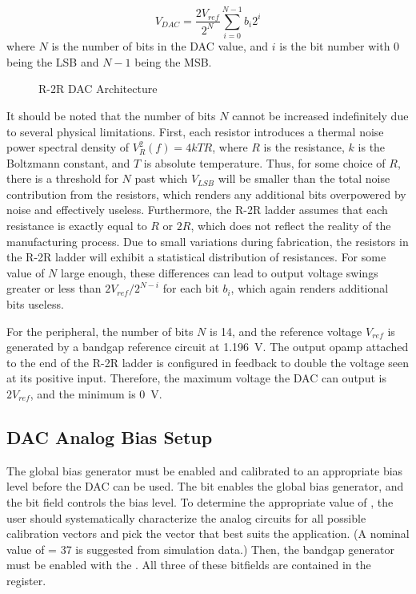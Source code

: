\begin{equation*}
	V_{DAC} = \frac{2V_{ref}}{2^N} \sum_{i=0}^{N-1} b_i 2^i
\end{equation*}
where $N$ is the number of bits in the DAC value, and $i$ is the bit number with 0 being the LSB and $N - 1$ being the MSB.

\begin{figure}[htpb]
	\centering
	
	\caption{R-2R DAC Architecture}
	\label{fig:r2r-dac-architecture}
\end{figure}

It should be noted that the number of bits $N$ cannot be increased indefinitely due to several physical limitations. First, each resistor introduces a thermal noise power spectral density of $V^2_R(f) = 4kTR$, where $R$ is the resistance, $k$ is the Boltzmann constant, and $T$ is absolute temperature. Thus, for some choice of $R$, there is a threshold for $N$ past which $V_{LSB}$ will be smaller than the total noise contribution from the resistors, which renders any additional bits overpowered by noise and effectively useless. Furthermore, the R-2R ladder assumes that each resistance is exactly equal to $R$ or $2R$, which does not reflect the reality of the manufacturing process. Due to small variations during fabrication, the resistors in the R-2R ladder will exhibit a statistical distribution of resistances. For some value of $N$ large enough, these differences can lead to output voltage swings greater or less than $2V_{ref}/2^{N-i}$ for each bit $b_i$, which again renders additional bits useless.

For the  peripheral, the number of bits $N$ is 14, and the reference voltage $V_{ref}$ is generated by a bandgap reference circuit at 1.196~\si{\volt}. The output opamp attached to the end of the R-2R ladder is configured in feedback to double the voltage seen at its positive input. Therefore, the maximum voltage the DAC can output is $2 V_{ref}$, and the minimum is 0~\si{\volt}.



\subsection{DAC Analog Bias Setup}

The global bias generator must be enabled and calibrated to an appropriate bias level before the DAC can be used. The  bit enables the global bias generator, and the  bit field controls the bias level. To determine the appropriate value of , the user should systematically characterize the analog circuits for all possible calibration vectors and pick the vector that best suits the application. (A nominal value of  = 37 is suggested from simulation data.) Then, the bandgap generator must be enabled with the . All three of these bitfields are contained in the  register.

